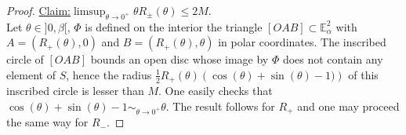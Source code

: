 \documentclass[a4paper,12pt]{article}
\def\E{\mathbf E}
\def\E{\mathbb{E}}
\def\E{\mathbb{E}}
\newenvironment{claim}[1]{\par\noindent\underline{Claim:}\space#1}{}
\theoremstyle{definition}
\begin{document}
\begin{proof}
% 				
% 				 
				\begin{claim}\label{claim:claim}{$\limsup_{\theta\rightarrow 0^+} \theta R_\pm(\theta)\leq 2M$.}
				\end{claim}
				 \\ Let $\theta\in ]0,\beta[$, $\Phi$ is defined on the interior the triangle $[OAB]\subset \E^2_{\alpha}$ with $A=(R_+(\theta),0)$ and $B=(R_+(\theta),\theta)$ in polar coordinates. The inscribed circle of $[OAB]$ bounds an open disc whose image by $\Phi$ does not contain any element of $S$, hence the radius $\frac{1}{2}R_+(\theta)\left(\cos(\theta)+\sin(\theta)-1)\right)$ of this inscribed circle is lesser than $M$. One easily checks that $\cos(\theta)+\sin(\theta)-1\sim_{\theta \rightarrow 0^+} \theta$. The result follows for $R_+$ and one may proceed the same way for $R_-$.


\end{proof}
\end{document}
